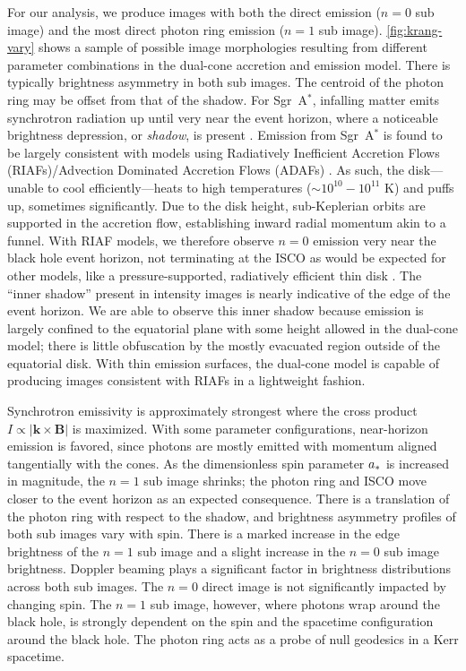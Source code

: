 \documentclass[linenumbers, twocolumn, tighten]{aastex701}
\def\sgra{Sgr~A$^*$\xspace}
\begin{document}
For our analysis, we produce images with both the direct emission ($n=0$ sub image) and the most direct photon ring emission ($n=1$ sub image). \autoref{fig:krang-vary} shows a sample of possible image morphologies resulting from different parameter combinations in the dual-cone accretion and emission model.
There is typically brightness asymmetry in both sub images. The centroid of the photon ring may be offset from that of the shadow. For \sgra, infalling matter emits synchrotron radiation up until very near the event horizon, where a noticeable brightness depression, or \textit{shadow}, is present \citep{Broderick_2016, Pu_2018, EHT2019-V}. Emission from \sgra is found to be largely consistent with models using Radiatively Inefficient Accretion Flows (RIAFs)/Advection Dominated Accretion Flows (ADAFs) \citep{2018ApJ...863..148P}. As such, the disk---unable to cool efficiently---heats to high temperatures ($\sim 10^{10}-10^{11}$ K) and puffs up, sometimes significantly. Due to the disk height, sub-Keplerian orbits are supported in the accretion flow, establishing inward radial momentum akin to a funnel. With RIAF models, we therefore observe $n = 0$ emission very near the black hole event horizon, not terminating at the ISCO as would be expected for other models, like a pressure-supported, radiatively efficient thin disk . The ``inner shadow'' present in intensity images is nearly indicative of the edge of the event horizon. We are able to observe this inner shadow because emission is largely confined to the equatorial plane with some height allowed in the dual-cone model; there is little obfuscation by the mostly evacuated region outside of the equatorial disk. With thin emission surfaces, the dual-cone model is capable of producing images consistent with RIAFs in a lightweight fashion.

Synchrotron emissivity is approximately strongest where the cross product $I \propto |\mathbf{k} \times \mathbf{B}|$ is maximized. With some parameter configurations, near-horizon emission is favored, since photons are mostly emitted with momentum aligned tangentially with the cones. As the dimensionless spin parameter $a_{\rm *}$ is increased in magnitude, the $n = 1$ sub image shrinks; the photon ring and ISCO move closer to the event horizon as an expected consequence. There is a translation of the photon ring with respect to the shadow, and brightness asymmetry profiles of both sub images vary with spin. There is a marked increase in the edge brightness of the $n = 1$ sub image and a slight increase in the $n = 0$ sub image brightness. Doppler beaming plays a significant factor in brightness distributions across both sub images. The $n = 0$ direct image is not significantly impacted by changing spin. The $n = 1$ sub image, however, where photons wrap around the black hole, is strongly dependent on the spin and the spacetime configuration around the black hole. The photon ring acts as a probe of null geodesics in a Kerr spacetime.
\end{document}
